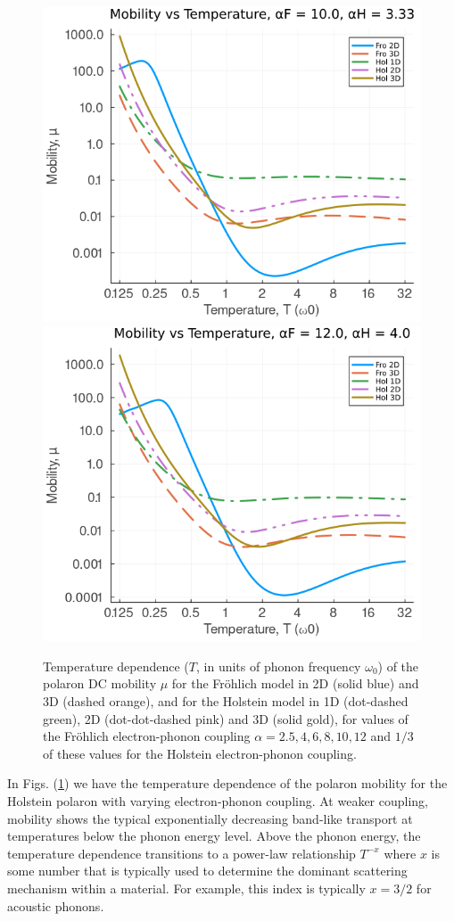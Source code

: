 \begin{figure}[!tbp]
    \includegraphics[width=.49\textwidth]{figures/mobility_temp_10_333.png}
    \includegraphics[width=.49\textwidth]{figures/mobility_temp_12_4.png}
    \caption{Temperature dependence ($T$, in units of phonon frequency $\omega_0$) of the polaron DC mobility $\mu$ for the Fr\"ohlich model in 2D (solid blue) and 3D (dashed orange), and for the Holstein model in 1D (dot-dashed green), 2D (dot-dot-dashed pink) and 3D (solid gold), for values of the Fr\"ohlich electron-phonon coupling $\alpha = 2.5, 4, 6, 8, 10, 12$ and $1/3$ of these values for the Holstein electron-phonon coupling.}
    \label{fig:mobility_temp}
\end{figure}
In Figs. (\ref{fig:mobility_temp}) we have the temperature dependence of the polaron mobility for the Holstein polaron with varying electron-phonon coupling. At weaker coupling, mobility shows the typical exponentially decreasing band-like transport at temperatures below the phonon energy level. Above the phonon energy, the temperature dependence transitions to a power-law relationship $T^{-x}$ where $x$ is some number that is typically used to determine the dominant scattering mechanism within a material. For example, this index is typically $x = 3/2$ for acoustic phonons. 

